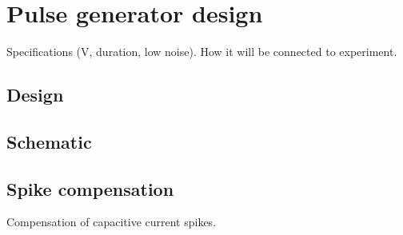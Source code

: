 \chapter{Pulse generator design}
\label{pulse_generator}

Specifications (V, duration, low noise).  How it will be connected to experiment.

\section{Design}

\section{Schematic}

\section{Spike compensation}

Compensation of capacitive current spikes.